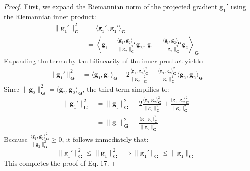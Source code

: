 \documentclass{article}
\theoremstyle{plain}
\theoremstyle{definition}
\theoremstyle{remark}
\begin{document}
\begin{proof}
First, we expand the Riemannian norm of the projected gradient $\mathbf{g}_1'$ using the Riemannian inner product:
\begin{align*}
    \|\mathbf{g}_1'\|_{\mathbf{G}}^2 &= \langle \mathbf{g}_1', \mathbf{g}_1' \rangle_{\mathbf{G}} \\
    &= \left\langle \mathbf{g}_1 - \frac{\langle \mathbf{g}_1, \mathbf{g}_2 \rangle_{\mathbf{G}}}{\|\mathbf{g}_2\|_{\mathbf{G}}^2} \mathbf{g}_2, \, \mathbf{g}_1 - \frac{\langle \mathbf{g}_1, \mathbf{g}_2 \rangle_{\mathbf{G}}}{\|\mathbf{g}_2\|_{\mathbf{G}}^2} \mathbf{g}_2 \right\rangle_{\mathbf{G}}
\end{align*}
Expanding the terms by the bilinearity of the inner product yields:
\begin{align*}
    \|\mathbf{g}_1'\|_{\mathbf{G}}^2 &= \langle \mathbf{g}_1, \mathbf{g}_1 \rangle_{\mathbf{G}} - 2 \frac{\langle \mathbf{g}_1, \mathbf{g}_2 \rangle_{\mathbf{G}}^2}{\|\mathbf{g}_2\|_{\mathbf{G}}^2} + \frac{\langle \mathbf{g}_1, \mathbf{g}_2 \rangle_{\mathbf{G}}^2}{\|\mathbf{g}_2\|_{\mathbf{G}}^4} \langle \mathbf{g}_2, \mathbf{g}_2 \rangle_{\mathbf{G}}
\end{align*}
Since $\|\mathbf{g}_2\|_{\mathbf{G}}^2 = \langle \mathbf{g}_2, \mathbf{g}_2 \rangle_{\mathbf{G}}$, the third term simplifies to:
\begin{align*}
    \|\mathbf{g}_1'\|_{\mathbf{G}}^2 &= \|\mathbf{g}_1\|_{\mathbf{G}}^2 - 2 \frac{\langle \mathbf{g}_1, \mathbf{g}_2 \rangle_{\mathbf{G}}^2}{\|\mathbf{g}_2\|_{\mathbf{G}}^2} + \frac{\langle \mathbf{g}_1, \mathbf{g}_2 \rangle_{\mathbf{G}}^2}{\|\mathbf{g}_2\|_{\mathbf{G}}^2} \\
    &= \|\mathbf{g}_1\|_{\mathbf{G}}^2 - \frac{\langle \mathbf{g}_1, \mathbf{g}_2 \rangle_{\mathbf{G}}^2}{\|\mathbf{g}_2\|_{\mathbf{G}}^2}
\end{align*}
Because $\frac{\langle \mathbf{g}_1, \mathbf{g}_2 \rangle_{\mathbf{G}}^2}{\|\mathbf{g}_2\|_{\mathbf{G}}^2} \ge 0$, it follows immediately that:
\begin{equation*}
    \|\mathbf{g}_1'\|_{\mathbf{G}}^2 \le \|\mathbf{g}_1\|_{\mathbf{G}}^2 \implies \|\mathbf{g}_1'\|_{\mathbf{G}} \le \|\mathbf{g}_1\|_{\mathbf{G}}
\end{equation*}
This completes the proof of Eq. 17. 


\end{proof}
\end{document}
